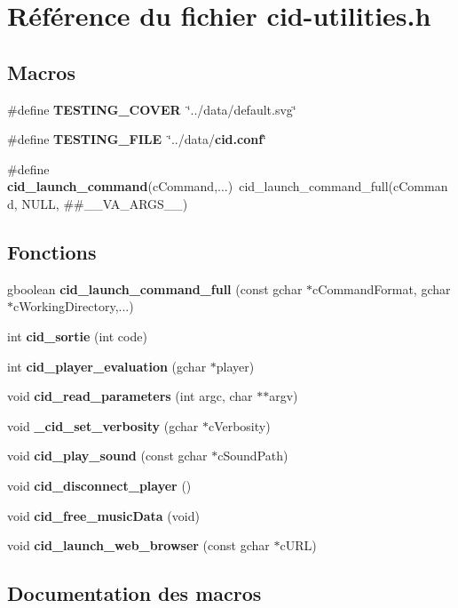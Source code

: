 \section{Référence du fichier cid-utilities.h}
\label{cid-utilities_8h}
\subsection*{Macros}
\begin{CompactItemize}
\item 
\#define {\bf TESTING\_\-COVER}~\char`\"{}../data/default.svg\char`\"{}
\item 
\#define {\bf TESTING\_\-FILE}~\char`\"{}../data/{\bf cid.conf}\char`\"{}
\item 
\#define {\bf cid\_\-launch\_\-command}(cCommand,...)~cid\_\-launch\_\-command\_\-full(cCommand, NULL, \#\#\_\-\_\-VA\_\-ARGS\_\-\_\-)
\end{CompactItemize}
\subsection*{Fonctions}
\begin{CompactItemize}
\item 
gboolean {\bf cid\_\-launch\_\-command\_\-full} (const gchar $\ast$cCommandFormat, gchar $\ast$cWorkingDirectory,...)
\item 
int {\bf cid\_\-sortie} (int code)
\item 
int {\bf cid\_\-player\_\-evaluation} (gchar $\ast$player)
\item 
void {\bf cid\_\-read\_\-parameters} (int argc, char $\ast$$\ast$argv)
\item 
void {\bf \_\-cid\_\-set\_\-verbosity} (gchar $\ast$cVerbosity)
\item 
void {\bf cid\_\-play\_\-sound} (const gchar $\ast$cSoundPath)
\item 
void {\bf cid\_\-disconnect\_\-player} ()
\item 
void {\bf cid\_\-free\_\-musicData} (void)
\item 
void {\bf cid\_\-launch\_\-web\_\-browser} (const gchar $\ast$cURL)
\end{CompactItemize}


\subsection{Documentation des macros}
